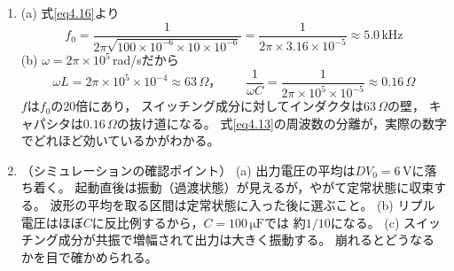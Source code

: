 \begin{enumerate}
\item[\ref{ex4.6}]
(a) 式\ref{eq4.16}より
\begin{equation*}
f_0 = \frac{1}{2\pi\sqrt{100\times10^{-6}\times10\times10^{-6}}}
= \frac{1}{2\pi\times3.16\times10^{-5}} \approx 5.0\,\mathrm{kHz}
\end{equation*}
(b) $\omega = 2\pi\times10^5$\,rad/sだから
\begin{equation*}
\omega L = 2\pi\times10^5\times10^{-4} \approx 63\,\Omega，\qquad
\frac{1}{\omega C} = \frac{1}{2\pi\times10^5\times10^{-5}} \approx 0.16\,\Omega
\end{equation*}
$f$は$f_0$の20倍にあり，
スイッチング成分に対してインダクタは$63\,\Omega$の壁，
キャパシタは$0.16\,\Omega$の抜け道になる。
式\ref{eq4.13}の周波数の分離が，実際の数字でどれほど効いているかがわかる。

\item[\ref{ex4.7}]

（シミュレーションの確認ポイント）
(a) 出力電圧の平均は$DV_0 = 6$\,Vに落ち着く。
起動直後は振動（過渡状態）が見えるが，やがて定常状態に収束する。
波形の平均を取る区間は定常状態に入った後に選ぶこと。
(b) リプル電圧はほぼ$C$に反比例するから，$C = 100\,\mathrm{\mu F}$では
約$1/10$になる。
(c) 
スイッチング成分が共振で増幅されて出力は大きく振動する。
崩れるとどうなるかを目で確かめられる。

\end{enumerate}
